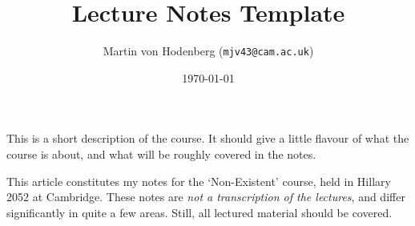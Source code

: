 \documentclass[a4paper]{scrartcl}
\title{Lecture Notes Template}
\author{Martin von Hodenberg (\texttt{mjv43@cam.ac.uk})}
\date{\today}
\begin{document}
\maketitle

This is a short description of the course. It should give a little flavour of what the course is about, and what will be roughly covered in the notes.

This article constitutes my notes for the `Non-Existent' course, held in Hillary 2052 at Cambridge. These notes are \emph{not a transcription of the lectures}, and differ significantly in quite a few areas. Still, all lectured material should be covered.



\tableofcontents
\end{document}
